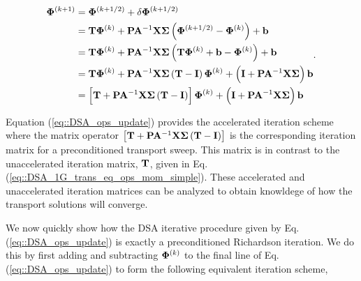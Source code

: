 \begin{equation}
\label{eq::DSA_ops_update}
\begin{aligned}
{\bf \Phi}^{(k+1)} &= {\bf \Phi}^{(k+1/2)} + \delta {\bf \Phi}^{(k+1/2)} \\
&= {\bf T}  {\bf \Phi}^{(k)}  + {\bf P} {\bf A}^{-1} {\bf X} {\bf \Sigma} \left( {\bf \Phi}^{(k+1/2)} - {\bf \Phi}^{(k)}  \right)  +  {\bf b} \\
&= {\bf T}  {\bf \Phi}^{(k)}  + {\bf P} {\bf A}^{-1} {\bf X} {\bf \Sigma} \left(  {\bf T}  {\bf \Phi}^{(k)} +  {\bf b} - {\bf \Phi}^{(k)}  \right)  +  {\bf b}  \\
&= {\bf T}  {\bf \Phi}^{(k)}  + {\bf P} {\bf A}^{-1} {\bf X} {\bf \Sigma} \left(  {\bf T}    - {\bf I} \right)  {\bf \Phi}^{(k)} + \left( {\bf I}+ {\bf P} {\bf A}^{-1}  {\bf X} {\bf \Sigma}   \right) {\bf b} \\
&= \left[ {\bf T}  + {\bf P} {\bf A}^{-1} {\bf X} {\bf \Sigma} \left(  {\bf T}    - {\bf I} \right) \right] {\bf \Phi}^{(k)}  + \left({\bf I}+  {\bf P} {\bf A}^{-1}  {\bf X} {\bf \Sigma}  \right) {\bf b}
\end{aligned} .
\end{equation}

\noindent Equation (\ref{eq::DSA_ops_update}) provides the accelerated iteration scheme where the matrix operator $\left[ {\bf T}  + {\bf P} {\bf A}^{-1} {\bf X} {\bf \Sigma} \left(  {\bf T}    - {\bf I} \right) \right]$ is the corresponding iteration matrix for a preconditioned transport sweep. This matrix is in contrast to the unaccelerated iteration matrix, ${\bf T}$, given in Eq. (\ref{eq::DSA_1G_trans_eq_ops_mom_simple}). These accelerated and unaccelerated iteration matrices can be analyzed to obtain knowldege of how the transport solutions will converge.

We now quickly show how the DSA iterative procedure given by Eq. (\ref{eq::DSA_ops_update}) is exactly a preconditioned Richardson iteration. We do this by first adding and subtracting ${\bf \Phi}^{(k)}$ to the final line of Eq. (\ref{eq::DSA_ops_update}) to form the following equivalent iteration scheme,

